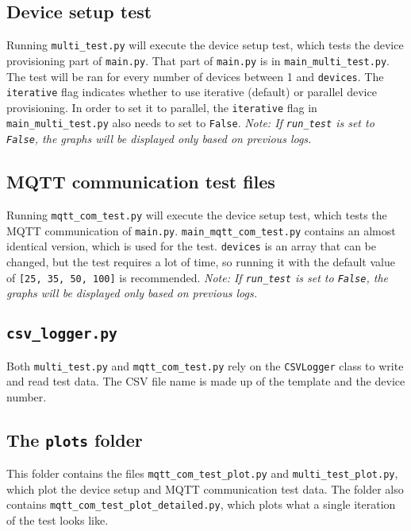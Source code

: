 \begin{appendices}
\subsection{Device setup test}
Running \lstinline{multi_test.py} will execute the device setup test, which tests the device provisioning part of \lstinline{main.py}. That part of \lstinline{main.py} is in \lstinline{main_multi_test.py}. The test will be ran for every number of devices between 1 and \lstinline{devices}.  The \lstinline{iterative} flag indicates whether to use iterative (default) or parallel device provisioning. In order to set it to parallel, the \lstinline{iterative} flag in \lstinline{main_multi_test.py} also needs to set to \lstinline{False}. 
\textit{Note: If \lstinline{run_test} is set to \lstinline{False}, the graphs will be displayed only based on previous logs.}

\subsection{MQTT communication test files}
Running \lstinline{mqtt_com_test.py} will execute the device setup test, which tests the MQTT communication of \lstinline{main.py}. \lstinline{main_mqtt_com_test.py} contains an almost identical version, which is used for the test. \lstinline{devices} is an array that can be changed, but the test requires a lot of time, so running it with the default value of \lstinline{[25, 35, 50, 100]} is recommended.
\textit{Note: If \lstinline{run_test} is set to \lstinline{False}, the graphs will be displayed only based on previous logs.}


\subsection{\lstinline{csv_logger.py}}
Both \lstinline{multi_test.py} and \lstinline{mqtt_com_test.py} rely on the \lstinline{CSVLogger} class to write and read test data. The CSV file name is made up of the template and the device number.

\subsection{The \lstinline{plots} folder}
This folder contains the files \lstinline{mqtt_com_test_plot.py} and \lstinline{multi_test_plot.py}, which plot the device setup and MQTT communication test data. The folder also contains \lstinline{mqtt_com_test_plot_detailed.py}, which plots what a single iteration of the test looks like.


\end{appendices}

